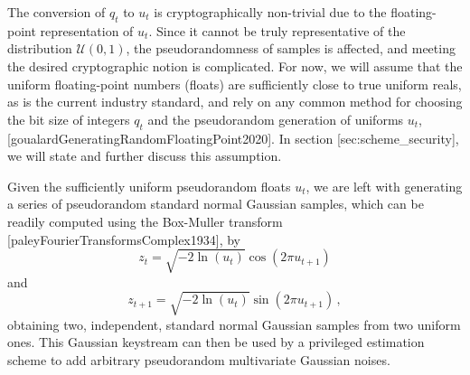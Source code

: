 The conversion of $q_t$ to $u_t$ is cryptographically non-trivial due to the floating-point representation of $u_t$. Since it cannot be truly representative of the distribution $\mathcal{U}(0,1)$, the pseudorandomness of samples is affected, and meeting the desired cryptographic notion is complicated. For now, we will assume that the uniform floating-point numbers (floats) are sufficiently close to true uniform reals, as is the current industry standard, and rely on any common method for choosing the bit size of integers $q_t$ and the pseudorandom generation of uniforms $u_t$, [goualardGeneratingRandomFloatingPoint2020]. In section [sec:scheme\_security], we will state and further discuss this assumption.

Given the sufficiently uniform pseudorandom floats $u_t$, we are left with generating a series of pseudorandom standard normal Gaussian samples, which can be readily computed using the Box-Muller transform [paleyFourierTransformsComplex1934], by
\begin{equation}
   z_t = \sqrt{-2\ln (u_t)}\cos(2\pi u_{t+1})
\end{equation}
and
\begin{equation}
   z_{t+1} = \sqrt{-2\ln (u_t)}\sin(2\pi u_{t+1})\,,
\end{equation}
obtaining two, independent, standard normal Gaussian samples from two uniform ones. This Gaussian keystream can then be used by a privileged estimation scheme to add arbitrary pseudorandom multivariate Gaussian noises.

% 
% 

